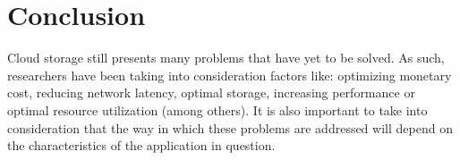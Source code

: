 \documentclass[14pt,oneside]{extreport}
\newcommand*\fpar{\hspace{1ex}}
\begin{document}
\section{Conclusion}
\fpar Cloud storage still presents many problems that have yet to be solved. As such, researchers have been taking into consideration factors like: optimizing monetary cost, reducing network latency, optimal storage, increasing performance or optimal resource utilization (among others). It is also important to take into consideration that the way in which these problems are addressed will depend on the characteristics of the application in question.



\end{document}
